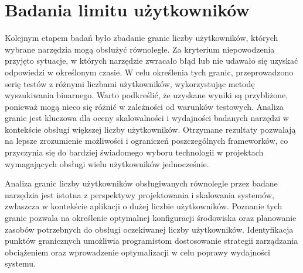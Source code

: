 \section{Badania limitu użytkowników}

Kolejnym etapem badań było zbadanie granic liczby użytkowników, których wybrane narzędzia mogą obsłużyć równolegle.
Za kryterium niepowodzenia przyjęto sytuacje, w których narzędzie zwracało błąd lub nie udawało się uzyskać odpowiedzi w określonym czasie.
W celu określenia tych granic, przeprowadzono serię testów z różnymi liczbami użytkowników, wykorzystując metodę wyszukiwania binarnego.
Warto podkreślić, że uzyskane wyniki są przybliżone, ponieważ mogą nieco się różnić w zależności od warunków testowych.
Analiza granic jest kluczowa dla oceny skalowalności i wydajności badanych narzędzi w kontekście obsługi większej liczby użytkowników.
Otrzymane rezultaty pozwalają na lepsze zrozumienie możliwości i ograniczeń poszczególnych frameworków, co przyczynia się do bardziej świadomego wyboru technologii w projektach wymagających obsługi wielu użytkowników jednocześnie.

Analiza granic liczby użytkowników obsługiwanych równolegle przez badane narzędzia jest istotna z perspektywy projektowania i skalowania systemów, zwłaszcza w kontekście aplikacji o dużej liczbie użytkowników.
Poznanie tych granic pozwala na określenie optymalnej konfiguracji środowiska oraz planowanie zasobów potrzebnych do obsługi oczekiwanej liczby użytkowników.
Identyfikacja punktów granicznych umożliwia programistom dostosowanie strategii zarządzania obciążeniem oraz wprowadzenie optymalizacji w celu poprawy wydajności systemu.
